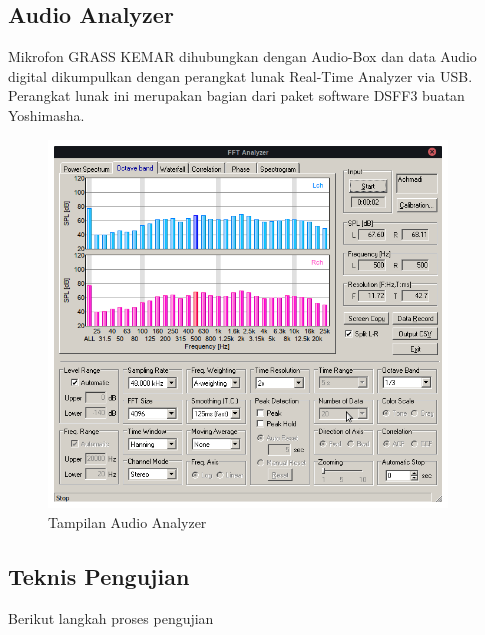 \documentclass[12pt,]{article}
\begin{document}
	\subsection{Audio Analyzer}
	
	Mikrofon GRASS KEMAR dihubungkan dengan Audio-Box dan data Audio digital dikumpulkan dengan perangkat lunak Real-Time Analyzer via USB.
	Perangkat lunak ini merupakan bagian dari paket software DSFF3 buatan Yoshimasha.
	
	\begin{figure}[!ht]
		\centering
		\includegraphics[width=300pt]{images/kemar/fft}
		\caption{Tampilan Audio Analyzer}
	\end{figure}
	
	\newpage
	\subsection{Teknis Pengujian}
	
	Berikut langkah proses pengujian
	
\end{document}
